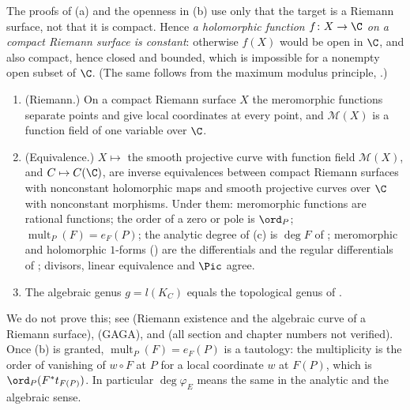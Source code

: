 The proofs of (a) and the openness in (b) use only that the target is a Riemann surface, not that it is compact. Hence \emph{a holomorphic function
$f\colon X\to\C$ on a compact Riemann surface is constant}: otherwise $f(X)$ would be open in $\C$, and also compact, hence closed and bounded, which is impossible for a
nonempty open subset of $\C$. (The same follows from the maximum modulus principle, .)

\begin{theorem}\label{thm:curves:riemann-existence}
\leavevmode
\begin{enumerate}[label=(\alph*)]
\item (Riemann.) On a compact Riemann surface $X$ the meromorphic functions separate points and give local coordinates at every point, and $\mathcal M(X)$ is a function field of
one variable over $\C$.
\item (Equivalence.) $X\mapsto$ the smooth projective curve with function field $\mathcal M(X)$, and $C\mapsto C(\C)$, are inverse equivalences between compact Riemann
surfaces with nonconstant holomorphic maps and smooth projective curves over $\C$ with nonconstant morphisms. Under them: meromorphic functions are rational
functions; the order of a zero or pole is $\ord_P$; $\operatorname{mult}_P(F)=e_F(P)$; the analytic degree of (c) is $\deg F$ of
; meromorphic and holomorphic $1$-forms () are the differentials and the regular differentials of
; divisors, linear equivalence and $\Pic$ agree.
\item The algebraic genus $g=l(K_C)$ equals the topological genus of .
\end{enumerate}
\end{theorem}

We do not prove this; see \cite[Chapters VI and VII]{Miranda} (Riemann existence and the algebraic curve of a Riemann surface), \cite[Appendix B]{Hartshorne}
(GAGA), and \cite[Sections 14 and 16]{Forster81} (all section and chapter numbers not verified). Once (b) is granted, $\operatorname{mult}_P(F)=e_F(P)$ is a tautology:
the multiplicity is the order of vanishing of $w\circ F$ at $P$ for a local coordinate $w$ at $F(P)$, which is $\ord_P(F^*t_{F(P)})$. In particular
$\deg\varphi_E$ means the same in the analytic and the algebraic sense.

